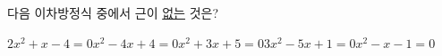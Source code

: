 다음 이차방정식 중에서 근이 \underline{없는} 것은?
\begin{choicesii}{$2x^2+x-4=0$}{$x^2-4x+4=0$}{$x^2+3x+5=0$}{$3x^2-5x+1=0$}{$x^2-x-1=0$}\end{choicesii}
